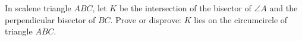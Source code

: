 In scalene triangle $ABC$, let $K$ be the intersection of the bisector of $\angle A$ and the perpendicular bisector of $BC$. Prove or disprove: $K$ lies on the circumcircle of triangle $ABC$.
